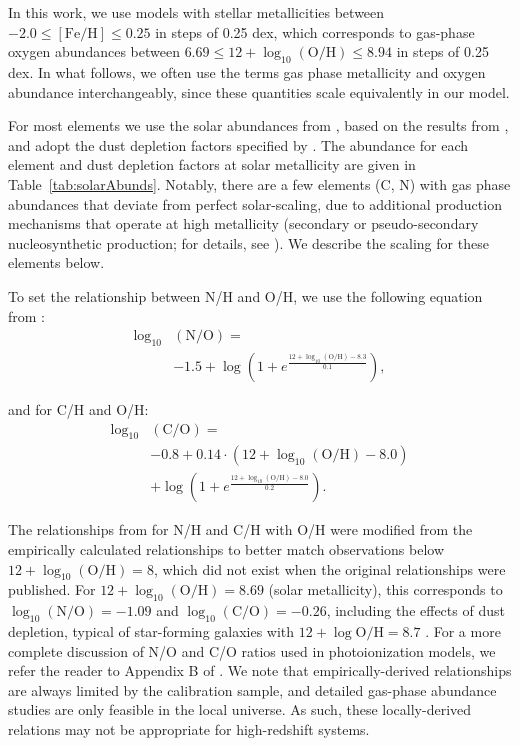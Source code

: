 \documentclass[preprint2]{aastex62}
\newcommand{\logten}{\ensuremath{\log_{10}}}
\newcommand{\logOH}{\ensuremath{\logten (\mathrm{O}/\mathrm{H})}\xspace}
\begin{document}
In this work, we use models with stellar metallicities between $-2.0 \leq [\mathrm{Fe}/\mathrm{H}] \leq 0.25$ in steps of 0.25 dex, which corresponds to gas-phase oxygen abundances between $6.69 \leq 12+\logOH \leq 8.94$ in steps of 0.25 dex. In what follows, we often use the terms gas phase metallicity and oxygen abundance interchangeably, since these quantities scale equivalently in our model. 

For most elements we use the solar abundances from \citet{Grevesse+2010}, based on the results from \citet{Asplund+2009}, and adopt the dust depletion factors specified by \citet{Dopita+2013}. The abundance for each element and dust depletion factors at solar metallicity are given in Table~\ref{tab:solarAbunds}. Notably, there are a few elements (C, N) with gas phase abundances that deviate from perfect solar-scaling, due to additional production mechanisms that operate at high metallicity (secondary or pseudo-secondary nucleosynthetic production; for details, see \citealt{Berg+2016}). We describe the scaling for these elements below.

To set the relationship between N/H and O/H, we use the following equation from :
\begin{equation}\label{eq:nitrogen}
\begin{aligned}
    \log_{10}&(\mathrm{N}/\mathrm{O}) = \\
    & -1.5 + \log\left( 1 + e^{\frac{12 + \log_{10}(\mathrm{O}/\mathrm{H})-8.3}{0.1}}\right),
\end{aligned}
\end{equation}

and for C/H and O/H:
\begin{equation}\label{eq:carbon}
\begin{aligned}
    \log_{10}&(\mathrm{C}/\mathrm{O}) = \\
    & -0.8 + 0.14\cdot\left(12 + \log_{10}(\mathrm{O}/\mathrm{H})-8.0\right) \\
    & + \log\left( 1 + e^{\frac{12 + \log_{10}(\mathrm{O}/\mathrm{H})-8.0}{0.2}}\right).
\end{aligned}
\end{equation}

\noindent The relationships from  for N/H and C/H with O/H were modified from the empirically calculated \citet{Dopita+2013} relationships to better match observations below $12+\logOH = 8$, which did not exist when the original relationships were published. For $12+\log_{10} (\mathrm{O}/\mathrm{H}) = 8.69$ (solar metallicity), this corresponds to $\log_{10} (\mathrm{N}/\mathrm{O}) = -1.09$ and $\log_{10} (\mathrm{C}/\mathrm{O}) = -0.26$, including the effects of dust depletion, typical of star-forming galaxies with $12 + \log \mathrm{O}/\mathrm{H} = 8.7$ \citep[e.g.,][]{Belfiore+2017b}. For a more complete discussion of N/O and C/O ratios used in photoionization models, we refer the reader to Appendix B of . We note that empirically-derived relationships are always limited by the calibration sample, and detailed gas-phase abundance studies are only feasible in the local universe. As such, these locally-derived relations may not be appropriate for high-redshift systems.
\end{document}
